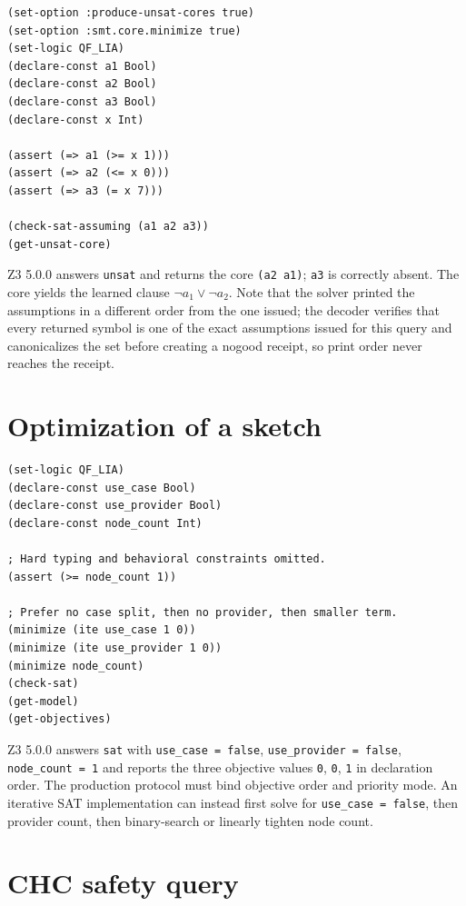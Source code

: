 \documentclass[11pt,oneside]{report}
\newcommand{\code}[1]{\texttt{#1}}
\begin{document}
\begin{lstlisting}[language=SMTLIB,caption={Core-derived grammar nogood.},label={lst:smt-core}]
(set-option :produce-unsat-cores true)
(set-option :smt.core.minimize true)
(set-logic QF_LIA)
(declare-const a1 Bool)
(declare-const a2 Bool)
(declare-const a3 Bool)
(declare-const x Int)

(assert (=> a1 (>= x 1)))
(assert (=> a2 (<= x 0)))
(assert (=> a3 (= x 7)))

(check-sat-assuming (a1 a2 a3))
(get-unsat-core)
\end{lstlisting}

Z3 5.0.0 answers \texttt{unsat} and returns the core \code{(a2 a1)}; \code{a3} is correctly absent. The core yields the learned clause $\neg a_1\lor\neg a_2$. Note that the solver printed the assumptions in a different order from the one issued; the decoder verifies that every returned symbol is one of the exact assumptions issued for this query and canonicalizes the set before creating a nogood receipt, so print order never reaches the receipt.

\section{Optimization of a sketch}

\begin{lstlisting}[language=SMTLIB,caption={Lexicographic sketch optimization.},label={lst:smt-opt}]
(set-logic QF_LIA)
(declare-const use_case Bool)
(declare-const use_provider Bool)
(declare-const node_count Int)

; Hard typing and behavioral constraints omitted.
(assert (>= node_count 1))

; Prefer no case split, then no provider, then smaller term.
(minimize (ite use_case 1 0))
(minimize (ite use_provider 1 0))
(minimize node_count)
(check-sat)
(get-model)
(get-objectives)
\end{lstlisting}

Z3 5.0.0 answers \texttt{sat} with \code{use\_case = false}, \code{use\_provider = false}, \code{node\_count = 1} and reports the three objective values \code{0}, \code{0}, \code{1} in declaration order. The production protocol must bind objective order and priority mode. An iterative SAT implementation can instead first solve for \code{use\_case = false}, then provider count, then binary-search or linearly tighten node count.

\section{CHC safety query}
\end{document}
